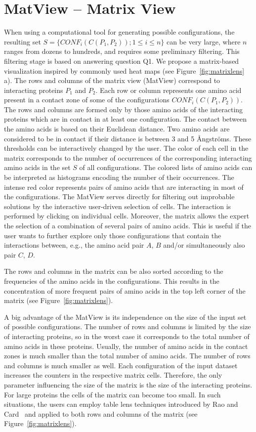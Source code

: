 \documentclass{bmcart}
\begin{document}
\section{MatView -- Matrix View}
When using a computational tool for generating possible configurations, the resulting set $S = \{CONF_i(C(P_1,P_2)); 1 \leq i \leq n\}$ can be very large, where $n$ ranges from dozens to hundreds, and requires some preliminary filtering.
This filtering stage is based on answering question Q1.
We propose a matrix-based visualization inspired by commonly used heat maps (see Figure~\ref{fig:matrixlens} a).
The rows and columns of the matrix view (MatView) correspond to interacting proteins $P_1$ and $P_2$.
Each row or column represents one amino acid present in a contact zone of some of the configurations $CONF_i(C(P_1,P_2))$. 
The rows and columns are formed only by those amino acids of the interacting proteins which are in contact in at least one configuration.
The contact between the amino acids is based on their Euclidean distance. 
Two amino acids are considered to be in contact if their distance is between 3 and 5 \AA ngstr\"{o}ms.
These thresholds can be interactively changed by the user.
The color of each cell in the matrix corresponds to the number of occurrences of the corresponding interacting amino acids in the set $S$ of all configurations. 
The colored lists of amino acids can be interpreted as histograms encoding the number of their occurrences.
The intense red color represents pairs of amino acids that are interacting in most of the configurations.
The MatView serves directly for filtering out improbable solutions by the interactive user-driven selection of cells.
The interaction is performed by clicking on individual cells. 
Moreover, the matrix allows the expert the selection of a combination of several pairs of amino acids.
This is useful if the user wants to further explore only those configurations that contain the interactions between, e.g., the amino acid pair $A$, $B$ and/or simultaneously also pair $C$, $D$. 

The rows and columns in the matrix can be also sorted according to the frequencies of the amino acids in the configurations. 
This results in the concentration of more frequent pairs of amino acids in the top left corner of the matrix (see Figure~\ref{fig:matrixlens}).

A big advantage of the MatView is its independence on the size of the input set of possible configurations.
The number of rows and columns is limited by the size of interacting proteins, so in the worst case it corresponds to the total number of amino acids in these proteins.
Usually, the number of amino acids in the contact zones is much smaller than the total number of amino acids.
The number of rows and columns is much smaller as well.
Each configuration of the input dataset increases the counters in the respective matrix cells.
Therefore, the only parameter influencing the size of the matrix is the size of the interacting proteins.
For large proteins the cells of the matrix can become too small.
In such situations, the users can employ table lens techniques introduced by Rao and Card~\cite{Rao1994} and applied to both rows and columns of the matrix (see Figure~\ref{fig:matrixlens}).
\end{document}
